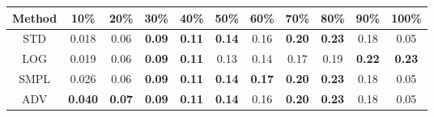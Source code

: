 \documentclass{standalone}
\begin{document}
\begin{tabular}{c|cccccccccc}
      \toprule
      Method & 10\% & 20\% & 30\% & 40\% & 50\% & 60\% & 70\% & 80\% & 90\% & 100\% \\
      \midrule
STD & 0.018 & 0.06 & \textbf{0.09} & \textbf{0.11} & \textbf{0.14} & 0.16 & \textbf{0.20} & \textbf{0.23} & 0.18 & 0.05\\
LOG & 0.019 & 0.06 & \textbf{0.09} & \textbf{0.11} & 0.13 & 0.14 & 0.17 & 0.19 & \textbf{0.22} & \textbf{0.23}\\
SMPL & 0.026 & 0.06 & \textbf{0.09} & \textbf{0.11} & \textbf{0.14} & \textbf{0.17} & \textbf{0.20} & \textbf{0.23} & 0.18 & 0.05\\
ADV & \textbf{0.040} & \textbf{0.07} & \textbf{0.09} & \textbf{0.11} & \textbf{0.14} & 0.16 & \textbf{0.20} & \textbf{0.23} & 0.18 & 0.05\\
  \bottomrule
\end{tabular}
\end{document}
